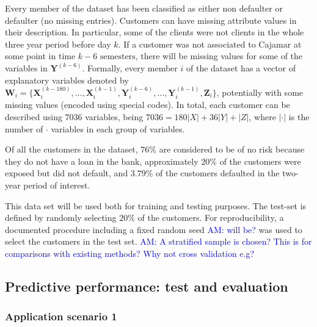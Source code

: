 \documentclass{article}
\theoremstyle{theorem}
\theoremstyle{definition}
\newcommand{\W}{\mathbf{W}}
\newcommand{\X}{\mathbf{X}}
\newcommand{\Y}{\mathbf{Y}}
\newcommand{\Z}{\mathbf{Z}}
\begin{document}
Every member of the dataset has been classified as either non defaulter or defaulter (no missing entries). 
Customers can have missing attribute values in their description. In particular, some of the clients were not clients in the whole three year period before day $k$. If a customer was not associated to Cajamar at some point in time $k - 6 \mbox{ semesters}$, there will be missing values for some of the variables in $\Y^{(k-6)}$. 
Formally, every member $i$ of the dataset  has a vector of explanatory variables denoted by $\W_i=\{ \X_i^{(k-180)}, \ldots, \X_i^{(k-1)}, \Y_i^{(k-6)},\ldots, \Y_i^{(k-1)},\Z_i\}$, potentially with some missing values (encoded using special codes). 
In total, each customer can be described using $7036$ variables, being $7036 = 180|X| + 36|Y| + |Z|$, where $|\cdot|$ is the number of $\cdot$ variables in each group of variables.

Of all the customers in the dataset, $76\%$ are considered to be of no risk because they do not have a loan in the bank, approximately $20\%$ of the customers were exposed but did not default, and $3.79\%$ of the customers  defaulted in the two-year period of interest. 

This data set will be used both for training and testing purposes. The test-set is defined by randomly selecting $20\%$ of the customers. For reproducibility, a documented procedure including a fixed random seed \textcolor{blue}{AM: will be?} was used to select the customers in the test set. \textcolor{blue}{AM: A stratified sample is chosen? This is for comparisons with existing methods? Why not cross validation e.g?}




\subsection{Predictive performance: test and evaluation}


\subsubsection{Application scenario 1}
\end{document}
